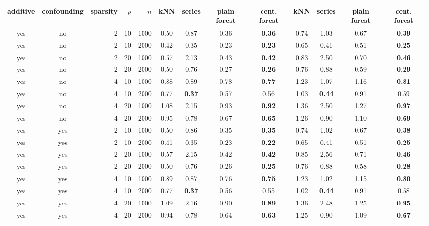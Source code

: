 \begin{table}[ht]
\centering
\begin{tabular}{||cc|rrr||cccc|cccc||}
  \hline
\hline
additive & confounding & sparsity & $p$ & $n$ & kNN & series & plain forest & cent. forest & kNN & series & plain forest & cent. forest \\ 
  \hline
\hline
yes & no & 2 & 10 & 1000 & 0.50 & 0.87 & 0.36 & \bf 0.36 & 0.74 & 1.03 & 0.67 & \bf 0.39 \\ 
  yes & no & 2 & 10 & 2000 & 0.42 & 0.35 & 0.23 & \bf 0.23 & 0.65 & 0.41 & 0.51 & \bf 0.25 \\ 
  yes & no & 2 & 20 & 1000 & 0.57 & 2.13 & 0.43 & \bf 0.42 & 0.83 & 2.50 & 0.70 & \bf 0.46 \\ 
  yes & no & 2 & 20 & 2000 & 0.50 & 0.76 & 0.27 & \bf 0.26 & 0.76 & 0.88 & 0.59 & \bf 0.29 \\ 
   \hline
yes & no & 4 & 10 & 1000 & 0.88 & 0.89 & 0.78 & \bf 0.77 & 1.23 & 1.07 & 1.16 & \bf 0.81 \\ 
  yes & no & 4 & 10 & 2000 & 0.77 & \bf 0.37 & 0.57 & 0.56 & 1.03 & \bf 0.44 & 0.91 & 0.59 \\ 
  yes & no & 4 & 20 & 1000 & 1.08 & 2.15 & 0.93 & \bf 0.92 & 1.36 & 2.50 & 1.27 & \bf 0.97 \\ 
  yes & no & 4 & 20 & 2000 & 0.95 & 0.78 & 0.67 & \bf 0.65 & 1.26 & 0.90 & 1.10 & \bf 0.69 \\ 
   \hline
yes & yes & 2 & 10 & 1000 & 0.50 & 0.86 & 0.35 & \bf 0.35 & 0.74 & 1.02 & 0.67 & \bf 0.38 \\ 
  yes & yes & 2 & 10 & 2000 & 0.41 & 0.35 & 0.23 & \bf 0.22 & 0.65 & 0.41 & 0.51 & \bf 0.25 \\ 
  yes & yes & 2 & 20 & 1000 & 0.57 & 2.15 & 0.42 & \bf 0.42 & 0.85 & 2.56 & 0.71 & \bf 0.46 \\ 
  yes & yes & 2 & 20 & 2000 & 0.50 & 0.76 & 0.26 & \bf 0.25 & 0.76 & 0.88 & 0.58 & \bf 0.28 \\ 
   \hline
yes & yes & 4 & 10 & 1000 & 0.89 & 0.87 & 0.76 & \bf 0.75 & 1.23 & 1.02 & 1.15 & \bf 0.80 \\ 
  yes & yes & 4 & 10 & 2000 & 0.77 & \bf 0.37 & 0.56 & 0.55 & 1.02 & \bf 0.44 & 0.91 & 0.58 \\ 
  yes & yes & 4 & 20 & 1000 & 1.09 & 2.16 & 0.90 & \bf 0.89 & 1.36 & 2.48 & 1.25 & \bf 0.95 \\ 
  yes & yes & 4 & 20 & 2000 & 0.94 & 0.78 & 0.64 & \bf 0.63 & 1.25 & 0.90 & 1.09 & \bf 0.67 \\ 

\end{tabular}
\end{table}

